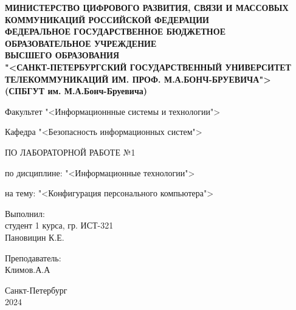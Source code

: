 \documentclass[a4paper]{article}
\begin{document}
\begin{titlepage}
\begin{center}
\textbf{МИНИСТЕРСТВО ЦИФРОВОГО РАЗВИТИЯ, СВЯЗИ И МАССОВЫХ КОММУНИКАЦИЙ РОССИЙСКОЙ ФЕДЕРАЦИИ \\
ФЕДЕРАЛЬНОЕ ГОСУДАРСТВЕННОЕ БЮДЖЕТНОЕ ОБРАЗОВАТЕЛЬНОЕ УЧРЕЖДЕНИЕ \\
ВЫСШЕГО ОБРАЗОВАНИЯ \\
"<САНКТ-ПЕТЕРБУРГСКИЙ ГОСУДАРСТВЕННЫЙ УНИВЕРСИТЕТ ТЕЛЕКОММУНИКАЦИЙ ИМ. ПРОФ. М.А.БОНЧ-БРУЕВИЧА"> \\
(СПБГУТ им. М.А.Бонч-Бруевича)}

\centerline{\hfill\hrulefill\hrulefill\hfill}

\vfill

Факультет "<Информационнные системы и технологии">

Кафедра "<Безопасность информационных систем">

\vfill

\large{ ПО ЛАБОРАТОРНОЙ РАБОТЕ №1}

по дисциплине: "<Информационные технологии">

на тему: "<Конфигурация персонального компьютера">

\end{center}

\vfill


\begin{flushright}
Выполнил: \\
студент 1 курса, гр. ИСТ-321 \\
Пановицин К.Е. 

\bigskip
Преподаватель: \\ 
Климов.А.А
\end{flushright}

\vfill
\vfill

\begin{center}

Санкт-Петербург \\
2024
\thispagestyle{empty}
\end{center}
\end{titlepage}
\setcounter{page}{2}
\end{document}
